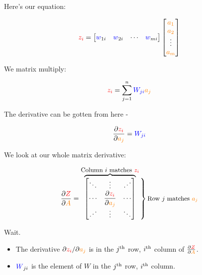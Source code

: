         Here's our equation:
        
        \begin{equation}
            \textcolor{red}{z_i} 
            =
            \begin{bmatrix}
                \textcolor{blue}{w}_{1i} & \textcolor{blue}{w}_{2i} & \cdots & \textcolor{blue}{w}_{mi}
            \end{bmatrix}
            \begin{bmatrix}
                \textcolor{orange}{a_1}\\\textcolor{orange}{a_2}\\ \vdots \\ \textcolor{orange}{a_m}
            \end{bmatrix}
        \end{equation}
        
        We matrix multiply:
        
        \begin{equation}
            \textcolor{red}{z_i} 
            =
            \sum_{j=1}^n
            \textcolor{blue}{W_{ji} }\textcolor{orange}{a_j}
        \end{equation}
        
        The derivative can be gotten from here -
        
        \begin{equation}
            \frac{\partial  \textcolor{red}{z_i} }{\partial  \textcolor{orange}{a_j}  } =  \textcolor{blue}{W_{ji}}
        \end{equation}
        
        We look at our whole matrix derivative:

        
        \begin{equation}
            \pderiv{ \red{Z} }{ \org{A} } 
            =
            \overbrace{
                \begin{bmatrix}
                    \ddots &  \vdots                               & \iddots \\
                    \cdots & \bigpderiv{ \red{z_i} }{ \org{a_j}  } & \cdots \\
                    \iddots& \vdots                                & \ddots
                \end{bmatrix}
                }^{ \text{\small Column $i$ matches $\red{z_i}$} }
            \bigggrB{60pt} \text{\small Row $j$ matches $\org{a_j}$} 
        \end{equation}
        
        Wait. 
        \begin{itemize}
            \item The derivative ${\partial  \textcolor{red}{z_i} }/{\partial  \textcolor{orange}{a_j}  }$ is in the $j^{ \text{th} }$ row, $i^{ \text{th} }$ column of $\frac{\partial  \textcolor{red}{Z} }{\partial  \textcolor{orange}{A} }$.
            
            \item $\textcolor{blue}{W}_{ji}$ is  the element of $W$ in the $j^{ \text{th} }$ row, $i^{ \text{th} }$ column.
        \end{itemize}
        
